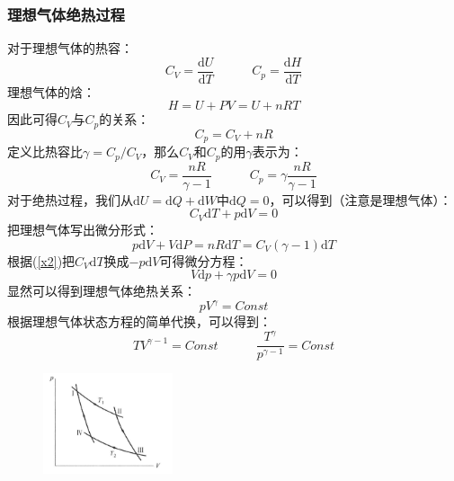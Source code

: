 \documentclass[12pt]{article}
\begin{document}
\subsubsection{理想气体绝热过程}
\noindent
对于理想气体的热容：
\begin{equation}
	C_V=\frac{\mathrm{d}U}{\mathrm{d}T}\quad \quad \quad C_p=\frac{\mathrm{d}H}{\mathrm{d}T}
\end{equation}
理想气体的焓：
\begin{equation}
	H=U+PV=U+nRT
\end{equation}
因此可得$C_V$与$C_p$的关系：
\begin{equation}
	C_p=C_V+nR
\end{equation}
定义比热容比$\gamma=C_p/C_V$，那么$C_V$和$C_p$的用$\gamma$表示为：
\begin{equation}
	C_V=\frac{nR}{\gamma-1}\quad \quad \quad C_p=\gamma \frac{nR}{\gamma-1}
\end{equation}
对于绝热过程，我们从$\mathrm{d}U=\mathrm{d}Q+\mathrm{d}W$中$\mathrm{d}Q=0$，可以得到（注意是理想气体）：
\begin{equation}
	C_V\mathrm{d}T+p\mathrm{d}V=0
	\label{x2}
\end{equation}
把理想气体写出微分形式：
\begin{equation}
	p\mathrm{d}V+V\mathrm{d}P=nR\mathrm{d}T=C_V(\gamma-1)\mathrm{d}T
\end{equation}
根据(\ref{x2})把$C_V\mathrm{d}T$换成$-p\mathrm{d}V$可得微分方程：
\begin{equation}
	V\mathrm{d}p+\gamma p\mathrm{d}V=0
\end{equation}
显然可以得到理想气体绝热关系：
\begin{equation}
	pV^\gamma=Const
\end{equation}
根据理想气体状态方程的简单代换，可以得到：
\begin{equation}
	TV^{\gamma-1}=Const \quad \quad \quad \frac{T^\gamma}{p^{\gamma-1}}=Const
\end{equation}
\begin{figure}
	\begin{center}
		\includegraphics[width=1.5in]{F1.png}
		\label{F1}
	\end{center}
\end{figure}
\end{document}
